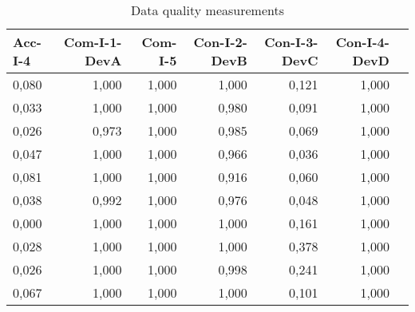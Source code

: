 \begin{table}[t]
\caption{Data quality measurements}
\label{tab:dataquality}
\begin{tabular}{|p{2cm}|r|r|r|r|r|r|}
\hline
Acc-I-4 & Com-I-1-DevA & Com-I-5 & Con-I-2-DevB & Con-I-3-DevC & Con-I-4-DevD \\
\hline
0,080\cellcolor[HTML]{FEF6F3}& 1,000\cellcolor[HTML]{FFFFFF}& 1,000\cellcolor[HTML]{FFFFFF}& 1,000\cellcolor[HTML]{FFFFFF}& 0,121\cellcolor[HTML]{FEF1ED}& 1,000\cellcolor[HTML]{FFFFFF}\\
0,033\cellcolor[HTML]{FEFBFA}& 1,000\cellcolor[HTML]{FFFFFF}& 1,000\cellcolor[HTML]{FFFFFF}& 0,980\cellcolor[HTML]{FEFCFC}& 0,091\cellcolor[HTML]{FEF5F2}& 1,000\cellcolor[HTML]{FFFFFF}\\
0,026\cellcolor[HTML]{FEFCFB}& 0,973\cellcolor[HTML]{FEFCFB}& 1,000\cellcolor[HTML]{FFFFFF}& 0,985\cellcolor[HTML]{FEFDFC}& 0,069\cellcolor[HTML]{FEF7F5}& 1,000\cellcolor[HTML]{FFFFFF}\\
0,047\cellcolor[HTML]{FEF9F8}& 1,000\cellcolor[HTML]{FFFFFF}& 1,000\cellcolor[HTML]{FFFFFF}& 0,966\cellcolor[HTML]{FEFBFA}& 0,036\cellcolor[HTML]{FEFBF9}& 1,000\cellcolor[HTML]{FFFFFF}\\
0,081\cellcolor[HTML]{FEF6F3}& 1,000\cellcolor[HTML]{FFFFFF}& 1,000\cellcolor[HTML]{FFFFFF}& 0,916\cellcolor[HTML]{FEF5F3}& 0,060\cellcolor[HTML]{FEF8F6}& 1,000\cellcolor[HTML]{FFFFFF}\\
0,038\cellcolor[HTML]{FEFAF9}& 0,992\cellcolor[HTML]{FEFEFD}& 1,000\cellcolor[HTML]{FFFFFF}& 0,976\cellcolor[HTML]{FEFCFB}& 0,048\cellcolor[HTML]{FEF9F8}& 1,000\cellcolor[HTML]{FFFFFF}\\
0,000\cellcolor[HTML]{FFFFFF}& 1,000\cellcolor[HTML]{FFFFFF}& 1,000\cellcolor[HTML]{FFFFFF}& 1,000\cellcolor[HTML]{FFFFFF}& 0,161\cellcolor[HTML]{FEEDE8}& 1,000\cellcolor[HTML]{FFFFFF}\\
0,028\cellcolor[HTML]{FEFBFB}& 1,000\cellcolor[HTML]{FFFFFF}& 1,000\cellcolor[HTML]{FFFFFF}& 1,000\cellcolor[HTML]{FFFFFF}& 0,378\cellcolor[HTML]{FDD5C9}& 1,000\cellcolor[HTML]{FFFFFF}\\
0,026\cellcolor[HTML]{FEFCFB}& 1,000\cellcolor[HTML]{FFFFFF}& 1,000\cellcolor[HTML]{FFFFFF}& 0,998\cellcolor[HTML]{FEFEFE}& 0,241\cellcolor[HTML]{FEE4DD}& 1,000\cellcolor[HTML]{FFFFFF}\\
0,067\cellcolor[HTML]{FEF7F5}& 1,000\cellcolor[HTML]{FFFFFF}& 1,000\cellcolor[HTML]{FFFFFF}& 1,000\cellcolor[HTML]{FFFFFF}& 0,101\cellcolor[HTML]{FEF3F0}& 1,000\cellcolor[HTML]{FFFFFF}\\
\hline
\end{tabular}
\end{table}

